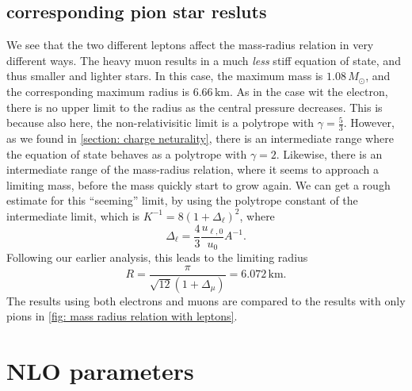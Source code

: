 \documentclass{book}
\begin{document}
\subsection{corresponding pion star resluts}
We see that the two different leptons affect the mass-radius relation in very different ways.
The heavy muon results in a much \emph{less} stiff equation of state, and thus smaller and lighter stars.
In this case, the maximum mass is $ 1.08\, M_\odot $, and the corresponding maximum radius is $6.66\,\text{km}$.
As in the case wit the electron, there is no upper limit to the radius as the central pressure decreases.
This is because also here, the non-relativisitic limit is a polytrope with $\gamma = \frac{5}{3}$.
However, as we found in \autoref{section: charge neturality}, there is an intermediate range where the equation of state behaves as a polytrope with $\gamma = 2$.
Likewise, there is an intermediate range of the mass-radius relation, where it seems to approach a limiting mass, before the mass quickly start to grow again.
We can get a rough estimate for this ``seeming'' limit, by using the polytrope constant of the intermediate limit, which is $K^{-1} = 8 (1 + \Delta_\ell)^2$, where
%
\begin{equation}
    \Delta_\ell = \frac{4}{3} \frac{u_{\ell, 0}}{u_0} A^{-1}.
\end{equation}
%
Following our earlier analysis, this leads to the limiting radius
%
\begin{equation}
    R = \frac{\pi}{\sqrt{12} (1 + \Delta_\mu)} = 6.072 \, \text{km}.
\end{equation}
%
The results using both electrons and muons are compared to the results with only pions in \autoref{fig: mass radius relation with leptons}.


\section{NLO parameters}
\end{document}
